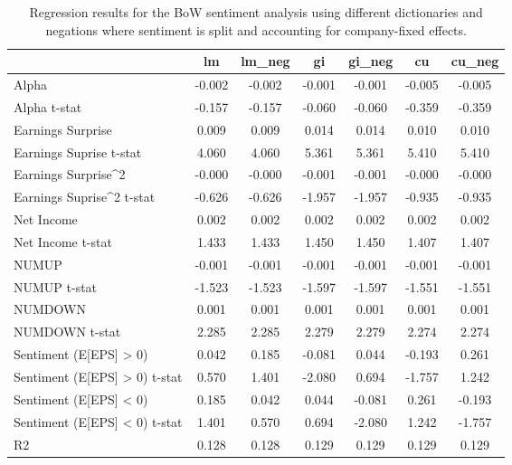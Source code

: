 \begin{table}
\caption{Regression results for the BoW sentiment analysis using different dictionaries and negations where sentiment is split and accounting for company-fixed effects.}
\label{tab:bow_regressions_split_company_fixed}
\begin{tabular}{lcccccc}
\toprule
 & lm & lm_neg & gi & gi_neg & cu & cu_neg \\
\midrule
Alpha & -0.002 & -0.002 & -0.001 & -0.001 & -0.005 & -0.005 \\
Alpha t-stat & -0.157 & -0.157 & -0.060 & -0.060 & -0.359 & -0.359 \\
Earnings Surprise & 0.009 & 0.009 & 0.014 & 0.014 & 0.010 & 0.010 \\
Earnings Suprise t-stat & 4.060 & 4.060 & 5.361 & 5.361 & 5.410 & 5.410 \\
Earnings Surprise^2 & -0.000 & -0.000 & -0.001 & -0.001 & -0.000 & -0.000 \\
Earnings Suprise^2 t-stat & -0.626 & -0.626 & -1.957 & -1.957 & -0.935 & -0.935 \\
Net Income & 0.002 & 0.002 & 0.002 & 0.002 & 0.002 & 0.002 \\
Net Income t-stat & 1.433 & 1.433 & 1.450 & 1.450 & 1.407 & 1.407 \\
NUMUP & -0.001 & -0.001 & -0.001 & -0.001 & -0.001 & -0.001 \\
NUMUP t-stat & -1.523 & -1.523 & -1.597 & -1.597 & -1.551 & -1.551 \\
NUMDOWN & 0.001 & 0.001 & 0.001 & 0.001 & 0.001 & 0.001 \\
NUMDOWN t-stat & 2.285 & 2.285 & 2.279 & 2.279 & 2.274 & 2.274 \\
Sentiment (E[EPS] > 0) & 0.042 & 0.185 & -0.081 & 0.044 & -0.193 & 0.261 \\
Sentiment (E[EPS] > 0) t-stat & 0.570 & 1.401 & -2.080 & 0.694 & -1.757 & 1.242 \\
Sentiment (E[EPS] < 0) & 0.185 & 0.042 & 0.044 & -0.081 & 0.261 & -0.193 \\
Sentiment (E[EPS] < 0) t-stat & 1.401 & 0.570 & 0.694 & -2.080 & 1.242 & -1.757 \\
R2 & 0.128 & 0.128 & 0.129 & 0.129 & 0.129 & 0.129 \\
\bottomrule
\end{tabular}
\end{table}
